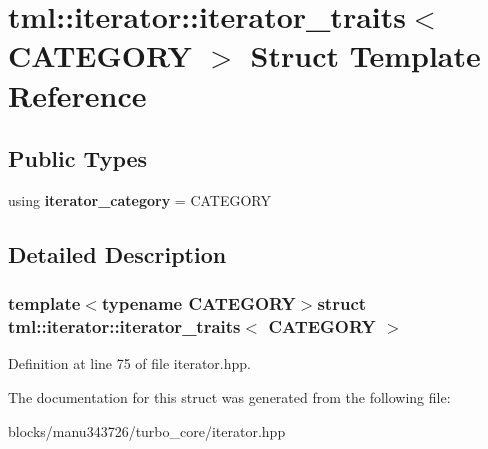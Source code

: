 \hypertarget{structtml_1_1iterator_1_1iterator__traits}{\section{tml\+:\+:iterator\+:\+:iterator\+\_\+traits$<$ C\+A\+T\+E\+G\+O\+R\+Y $>$ Struct Template Reference}
\label{structtml_1_1iterator_1_1iterator__traits}
}
\subsection*{Public Types}
\begin{DoxyCompactItemize}
\item 
\hypertarget{structtml_1_1iterator_1_1iterator__traits_ae2133b6fbf543ea7645c1b68c9bb1c42}{using {\bfseries iterator\+\_\+category} = C\+A\+T\+E\+G\+O\+R\+Y}\label{structtml_1_1iterator_1_1iterator__traits_ae2133b6fbf543ea7645c1b68c9bb1c42}

\end{DoxyCompactItemize}


\subsection{Detailed Description}
\subsubsection*{template$<$typename C\+A\+T\+E\+G\+O\+R\+Y$>$struct tml\+::iterator\+::iterator\+\_\+traits$<$ C\+A\+T\+E\+G\+O\+R\+Y $>$}



Definition at line 75 of file iterator.\+hpp.



The documentation for this struct was generated from the following file\+:\begin{DoxyCompactItemize}
\item 
blocks/manu343726/turbo\+\_\+core/iterator.\+hpp\end{DoxyCompactItemize}
